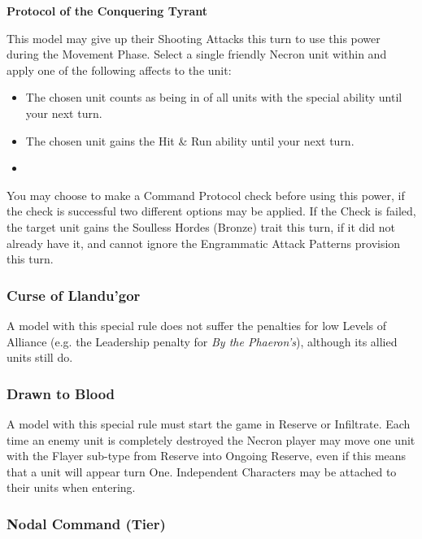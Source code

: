 \begin{multicols}{2}
\textbf{Protocol of the Conquering Tyrant}

This model may give up their Shooting Attacks this turn to use this power during the Movement Phase. Select a single friendly Necron unit within  and apply one of the following affects to the unit:

\begin{itemize}
	\itemsep 0pt
	\item The chosen unit counts as being in  of all units with the  special ability until your next turn.
	\item The chosen unit gains the Hit \& Run ability until your next turn.
	\item 
\end{itemize}

You may choose to make a Command Protocol check before using this power, if the check is successful two different options may be applied. If the Check is failed, the target unit gains the Soulless Hordes (Bronze) trait this turn, if it did not already have it, and cannot ignore the Engrammatic Attack Patterns provision this turn.

\subsubsection{Curse of Llandu'gor} \label{Curse of Llandu'gor}

A model with this special rule does not suffer the penalties for low Levels of Alliance (e.g. the Leadership penalty for \textit{By the Phaeron's}), although its allied units still do.

\subsubsection{Drawn to Blood} \label{Drawn to Blood}

A model with this special rule must start the game in Reserve or Infiltrate. Each time an enemy unit is completely destroyed the Necron player may move one unit with the Flayer sub-type from Reserve into Ongoing Reserve, even if this means that a unit will appear turn One. Independent Characters may be attached to their units when entering.

\subsubsection{Nodal Command (Tier)} \label{Nodal Command}


\end{multicols}
